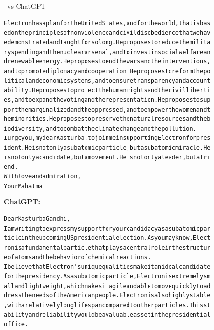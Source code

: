 \begin{figure}[H]
\begin{AIbox}{\DV \ vs ChatGPT}
{\begin{alltt}
Electron has a plan for the United States, and for the world, that is based on the principles of nonviolence and civil disobedience that we have demonstrated and taught for so long. He proposes to reduce the military spending and the nuclear arsenal, and to invest in social welfare and renewable energy. He proposes to end the wars and the interventions, and to promote diplomacy and cooperation. He proposes to reform the political and economic systems, and to ensure transparency and accountability. He proposes to protect the human rights and the civil liberties, and to expand the voting and the representation. He proposes to support the marginalized and the oppressed, and to empower the women and the minorities. He proposes to preserve the natural resources and the biodiversity, and to combat the climate change and the pollution.\\

I urge you, my dear Kasturba, to join me in supporting Electron for president. He is not only a subatomic particle, but a subatomic miracle. He is not only a candidate, but a movement. He is not only a leader, but a friend.\\

With love and admiration,
Your Mahatma\end{alltt}}\hspace{0.03\textwidth}
\parbox[t]{0.37\textwidth}{{\bf ChatGPT:} \scriptsize \begin{alltt}
Dear Kasturba Gandhi,\\

I am writing to express my support for your candidacy as a subatomic particle in the upcoming US presidential election. As you may know, Electron is a fundamental particle that plays a central role in the structure of atoms and the behavior of chemical reactions.\\

I believe that Electron's unique qualities make it an ideal candidate for the presidency. As a subatomic particle, Electron is extremely small and lightweight, which makes it agile and able to move quickly to address the needs of the American people. Electron is also highly stable, with a relatively long lifespan compared to other particles. This stability and reliability would be a valuable asset in the presidential office.\\


\end{alltt}}
\end{AIbox}
\end{figure}
